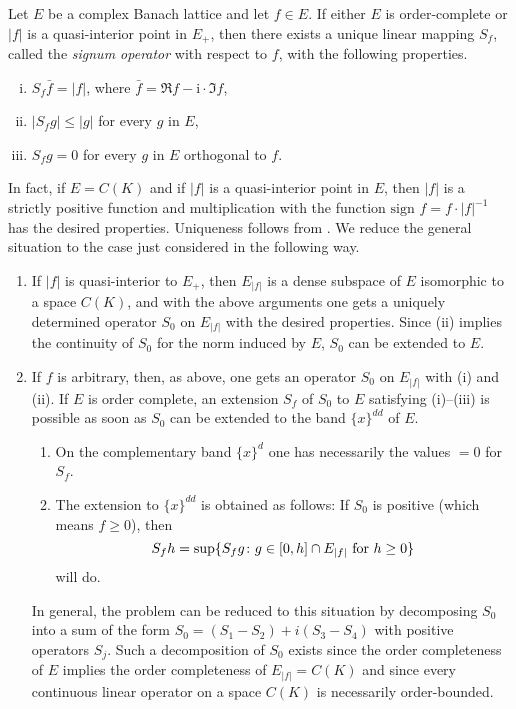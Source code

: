 Let $ E $ be a complex Banach lattice and let $ f \in E $.
If either $ E $ is order-complete or $ |f| $ is a quasi-interior point in $ E_{+} $, then there exists a unique linear mapping $ S_{f} $, called the \emph{signum operator} with respect to $ f $, with the following properties.
\begin{enumerate}[(i)]

\item 
$ S_{f}\bar{f} = |f| $, where $ \bar{f} = \Re f -  \mathrm{i} \cdot\Im f $,

\item 
$ |S_{f}g| \leq |g| $ for every $ g $ in $ E $,

\item 
$ S_{f}g = 0 $ for every $ g $ in $ E $ orthogonal to $ f $.
\end{enumerate}
In fact, if $ E = C(K) $ and if $ |f| $ is a quasi-interior point in $ E $, then $ |f| $ is a strictly positive function and multiplication with the function $ \text{sign } f = f\cdot|f|^{-1} $ has the desired properties.
Uniqueness follows from \citet[Chap. 20]{zaanen:1983}. %
We reduce the general situation to the case just considered in the following way.
\begin{enumerate}[---]

\item 
If $ |f| $ is quasi-interior to $ E_{+} $, then $ E_{|f|} $ is a dense subspace of $ E $ isomorphic to a space $ C(K) $, and with the above arguments one gets a uniquely determined operator $ S_{0} $ on $ E_{|f|} $ with the desired properties.
Since (ii) implies the continuity of $ S_{0} $ for the norm induced by $ E $, $ S_{0} $ can be extended to $ E $.

\item 
If $ f $ is arbitrary, then, as above, one gets an operator $ S_{0} $ on $ E_{|f|} $ with (i) and (ii).
If $ E $ is order complete, an extension $ S_{f} $ of $ S_{0} $ to $ E $ satisfying (i)--(iii) is possible as soon as $ S_{0} $ can be extended to the band $ \{x\}^{dd} $ of $ E $.

\begin{enumerate}[-]
\item
On the complementary band $ \{x\}^{d} $ one has necessarily the values $ = 0 $ for $ S_{f} $.

\item
The extension to $ \{x\}^{dd} $ is obtained as follows:
If $ S_{0} $ is positive (which means $ f \geq 0 $), then
\[
S_{f}h = \sup \{ S_{f}g \colon g \in [0,h] \cap E_{|f|} \text{ for $ h \geq 0 $} \}
\]
will do.
\end{enumerate}
In general, the problem can be reduced to this situation by decomposing $ S_{0} $ into a sum of the form $ S_{0} = (S_{1} - S_{2}) + i(S_{3} - S_{4}) $ with positive operators $ S_{j} $.
Such a decomposition of $ S_{0} $ exists since the order completeness of $ E $ implies the order completeness of $ E_{|f|} = C(K) $ and since every continuous linear operator on a space $ C(K) $ is necessarily order-bounded.

\end{enumerate}
